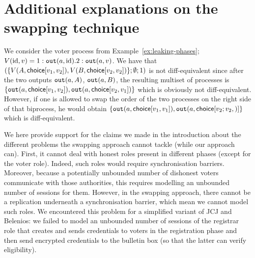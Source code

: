 
\section{Additional explanations on the swapping technique}
\label{sec:ap:swapping}

\label{sec:app:swapping}
  We consider the voter process from Example~\ref{ex:leaking-phases}; \ie
  $V(\mathrm{id},v)=1: \mathtt{out}(a,\mathrm{id}). 2: \mathtt{out}(a,v)$.
  We have that\linebreak[4]
  $(\{V(A,\mathsf{choice}[v_1,v_2]),
V(B,\mathsf{choice}[v_2,v_2])\};\emptyset;1)$ is
  not diff-equivalent since after the two outputs
  $\mathtt{out}(a,A)$, $\mathtt{out}(a,B)$, the resulting multiset of processes is
  $\{\mathtt{out}(a,\mathsf{choice}[v_1,v_2]), \mathtt{out}(a,\mathsf{choice}[v_2,v_1])\}$ which is
  obviously not diff-equivalent. However, if one is allowed to swap the
  order of the two processes on the right side of that biprocess, he
  would obtain
  $\{\Out(a,\choice{v_1}{v_1}),\linebreak[4] \Out(a,\choice{v_2;v_2})\}$ which is
  diff-equivalent.

\label{sec:app:swaprestr}

  We here provide support for the claims we made in the introduction about the different problems the swapping approach cannot
  tackle (while our approach can).
    First, it cannot deal with honest roles present in different phases
    (except for the voter role).
      Indeed, such roles would require synchronisation barriers.
      Moreover, because a potentially unbounded number of dishonest
      voters communicate with those authorities, this requires modelling
      an unbounded number of sessions for them.
      However, in the swapping approach, %
      there cannot be a replication underneath a synchronisation
      barrier, which mean we cannot model such roles.
      We encountered this problem for a simplified variant of JCJ and Belenios:
      we failed to model an unbounded number of sessions of the registrar role
      that creates and sends credentials to voters in the registration phase and
      then send encrypted credentials to the bulletin box (so that the latter can
      verify eligibility).

